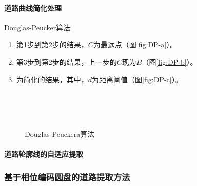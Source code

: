 \paragraph{道路曲线简化处理}Douglas-Peucker算法
\begin{enumerate}
	\item 第1步到第2步的结果，$ C $为最远点（图\ref{fig:DP-a}）。
	\item 第3步到第2步的结果，上一步的$ C $现为$ B $（图\ref{fig:DP-b}）。
	\item 为简化的结果，其中，$ d $为距离阈值（图\ref{fig:DP-c}）。
\end{enumerate}
\begin{figure}[htbp]
	\centering
	\\
	\\
	\\
	\caption{Douglas-Peuckera算法}
	\label{fig:douglas-peuckera}
\end{figure}

\paragraph{道路轮廓线的自适应提取}

\subsubsection{基于相位编码圆盘的道路提取方法}
